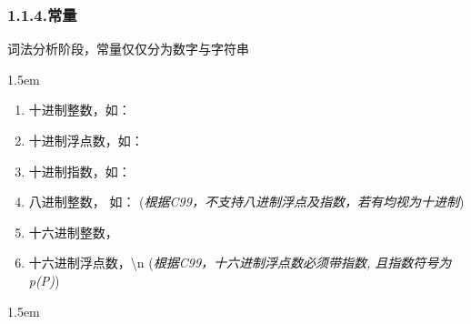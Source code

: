 \documentclass{article}
\begin{document}
\subsubsection{1.1.4.\hspace*{0.5em}常量}\label{num}%

\noindent{}词法分析阶段，常量仅仅分为数字与字符串%

\begin{mddefinitions}%


\begin{mdbmarginx}{}{}{}{1.5em}%
\begin{mddefdata}%
\end{mddefdata}%
\end{mdbmarginx}%
\end{mddefinitions}%

\begin{enumerate}[noitemsep,topsep=\mdcompacttopsep]%

\item{}十进制整数，如：%

\item{}十进制浮点数，如： %

\item{}十进制指数，如： %

\item{}八进制整数， 如：
(\emph{根据C99，不支持八进制浮点及指数，若有均视为十进制})%

\item{}十六进制整数，%

\item{}十六进制浮点数，\textbackslash{}n
 (\emph{根据C99，十六进制浮点数必须带指数, 且指数符号为p(P)})%
\end{enumerate}%

\begin{mddefinitions}%


\begin{mdbmarginx}{}{}{}{1.5em}%
\begin{mddefdata}%
\end{mddefdata}%
\end{mdbmarginx}%
\end{mddefinitions}%
\end{document}
